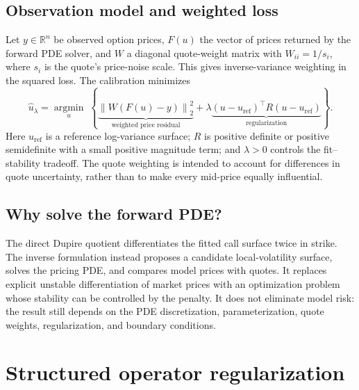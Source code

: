 \documentclass[11pt,a4paper]{article}
\newcommand{\R}{\mathbb{R}}\newcommand{\E}{\mathbb{E}}\newcommand{\Var}{\operatorname{Var}}\newcommand{\norm}[1]{\left\lVert#1\right\rVert}
\begin{document}
\subsection{Observation model and weighted loss}
Let $y\in\R^n$ be observed option prices, $F(u)$ the vector of prices returned by the forward PDE solver, and $W$ a diagonal quote-weight matrix with $W_{ii}=1/s_i$, where $s_i$ is the quote's price-noise scale. This gives inverse-variance weighting in the squared loss. The calibration minimizes
\begin{equation}\label{eq:objective}
 \widehat u_\lambda=\underset{u}{\operatorname{argmin}}\;
 \left\{
 \underbrace{\norm{W(F(u)-y)}_2^2}_{\text{weighted price residual}}
 +\lambda\underbrace{(u-u_{\mathrm{ref}})^\top R(u-u_{\mathrm{ref}})}_{\text{regularization}}
 \right\}.
\end{equation}
Here $u_{\mathrm{ref}}$ is a reference log-variance surface; $R$ is positive definite or positive semidefinite with a small positive magnitude term; and $\lambda>0$ controls the fit--stability tradeoff. The quote weighting is intended to account for differences in quote uncertainty, rather than to make every mid-price equally influential.

\subsection{Why solve the forward PDE?}
The direct Dupire quotient differentiates the fitted call surface twice in strike. The inverse formulation instead proposes a candidate local-volatility surface, solves the pricing PDE, and compares model prices with quotes. It replaces explicit unstable differentiation of market prices with an optimization problem whose stability can be controlled by the penalty. It does not eliminate model risk: the result still depends on the PDE discretization, parameterization, quote weights, regularization, and boundary conditions.

\section{Structured operator regularization}\label{sec:regularizer}
\end{document}
